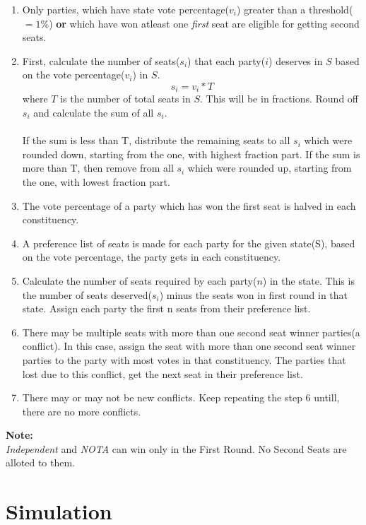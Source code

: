 \documentclass{article}
\begin{document}
\begin{enumerate}
\item Only parties, which have state vote percentage($v_i$) greater than a threshold($=1\%$) \textbf{or} which have won atleast one \emph{first} seat are eligible for getting second seats.
\item First, calculate the number of seats($s_i$) that each party($i$) deserves in $S$ based on the vote percentage($v_i$) in $S$.
$$ s_i = v_i*T $$
where $T$ is the number of total seats in $S$. This will be in fractions. Round off $s_i$ and calculate the sum of all $s_i$.\\ \\ If the sum is less than T, distribute the remaining seats to all $s_i$ which were rounded down, starting from the one, with highest fraction part. If the sum is more than T, then remove from all $s_i$ which were rounded up, starting from the one, with lowest fraction part.
\item The vote percentage of a party which has won the first seat is halved in each constituency.
\item A preference list of seats is made for each party for the given state(S), based on the vote percentage, the party gets in each constituency.
\item Calculate the number of seats required by each party($n$) in the state. This is the number of seats deserved($s_i$) minus the seats won in first round in that state. Assign each party the first n seats from their preference list. 
\item There may be multiple seats with more than one second seat winner parties(a conflict). In this case, assign the seat with more than one second seat winner parties to the party with most votes in that constituency. The parties that lost due to this conflict, get the next seat in their preference list. 
\item There may or may not be new conflicts. Keep repeating the step 6 untill, there are no more conflicts.
\end{enumerate}

\textbf{Note: } \\
\emph{Independent} and \emph{NOTA} can win only in the First Round. No Second Seats are alloted to them.

\section{Simulation}
\end{document}
